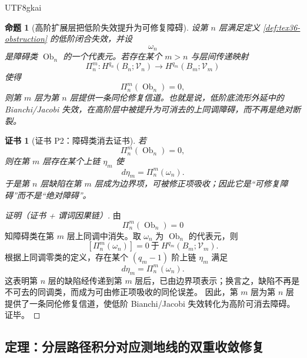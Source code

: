 \documentclass[12pt]{article}
\newtheorem{proposition}{命题}[section]
\newtheorem{Certificate}{证书}[section]
\newcommand{\Ob}{\operatorname{Ob}}
\begin{document}
\begin{CJK*}{UTF8}{gkai}
\begin{proposition}[高阶扩展层把低阶失效提升为可修复障碍]
\label{prop:tex36-repair-channel}
设第 $n$ 层满足定义 \ref{def:tex36-obstruction} 的低阶闭合失效，并设
\[
  \omega_n
\]
是障碍类 $\Ob_n$ 的一个代表元。若存在某个 $m>n$ 与层间传递映射
\[
  \Pi_n^m:
  H^{q_n}(B_n;\mathcal V_n)\to H^{q_m}(B_m;\mathcal V_m)
\]
使得
\[
  \Pi_n^m(\Ob_n)=0,
\]
则第 $m$ 层为第 $n$ 层提供一条同伦修复信道。也就是说，低阶底流形外延中的 Bianchi/Jacobi 失效，在高阶层中被提升为可消去的上同调障碍，而不再是绝对断裂。
\end{proposition}

\begin{Certificate}[证书 P2：障碍类消去证书]
\label{cert:tex36-p2}
若
\[
  \Pi_n^m(\Ob_n)=0,
\]
则在第 $m$ 层存在某个上链 $\eta_m$ 使
\[
  d\eta_m=\Pi_n^m(\omega_n).
\]
于是第 $n$ 层缺陷在第 $m$ 层成为边界项，可被修正项吸收；因此它是“可修复障碍”而不是“绝对障碍”。
\end{Certificate}

\begin{proof}[证明（证书 + 谓词因果链）]
由
\[
  \Pi_n^m(\Ob_n)=0
\]
知障碍类在第 $m$ 层上同调中消失。取 $\omega_n$ 为 $\Ob_n$ 的代表元，则
\[
  [\Pi_n^m(\omega_n)]=0
  \ \text{于}\
  H^{q_m}(B_m;\mathcal V_m).
\]
根据上同调零类的定义，存在某个 $(q_m-1)$ 阶上链 $\eta_m$ 满足
\[
  d\eta_m=\Pi_n^m(\omega_n).
\]
这表明第 $n$ 层的缺陷经传递到第 $m$ 层后，已由边界项表示；换言之，缺陷不再是不可去的同调类，而成为可由修正项吸收的同伦误差。
因此，第 $m$ 层为第 $n$ 层提供了一条同伦修复信道，使低阶 Bianchi/Jacobi 失效转化为高阶可消去障碍。证毕。
\end{proof}

\subsection{定理：分层路径积分对应测地线的双重收敛修复}
\label{subsec:tex36-double-convergence}


\end{CJK*}
\end{document}
